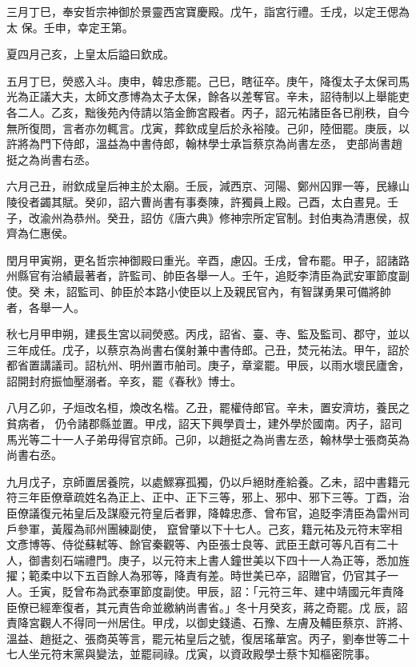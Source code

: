 \begin{pinyinscope}
 三月丁巳，奉安哲宗神御於景靈西宮寶慶殿。戊午，詣宮行禮。壬戌，以定王偲為太
 保。壬申，幸定王第。



 夏四月己亥，上皇太后謚曰欽成。



 五月丁巳，熒惑入斗。庚申，韓忠彥罷。己巳，瞎征卒。庚午，降復太子太保司馬光為正議大夫，太師文彥博為太子太保，餘各以差奪官。辛未，詔待制以上舉能吏各二人。乙亥，黜後苑內侍請以箔金飾宮殿者。丙子，詔元祐諸臣各已削秩，自今無所復問，言者亦勿輒言。戊寅，葬欽成皇后於永裕陵。己卯，陸佃罷。庚辰，以許將為門下侍郎，溫益為中書侍郎，翰林學士承旨蔡京為尚書左丞，
 吏部尚書趙挺之為尚書右丞。



 六月己丑，祔欽成皇后神主於太廟。壬辰，減西京、河陽、鄭州囚罪一等，民緣山陵役者蠲其賦。癸卯，詔六曹尚書有事奏陳，許獨員上殿。己酉，太白晝見。壬子，改渝州為恭州。癸丑，詔仿《唐六典》修神宗所定官制。封伯夷為清惠侯，叔齊為仁惠侯。



 閏月甲寅朔，更名哲宗神御殿曰重光。辛酉，慮囚。壬戌，曾布罷。甲子，詔諸路州縣官有治績最著者，許監司、帥臣各舉一人。壬午，追貶李清臣為武安軍節度副使。癸
 未，詔監司、帥臣於本路小使臣以上及親民官內，有智謀勇果可備將帥者，各舉一人。



 秋七月甲申朔，建長生宮以祠熒惑。丙戌，詔省、臺、寺、監及監司、郡守，並以三年成任。戊子，以蔡京為尚書右僕射兼中書侍郎。己丑，焚元祐法。甲午，詔於都省置講議司。詔杭州、明州置市舶司。庚子，章楶罷。甲辰，以雨水壞民廬舍，詔開封府振恤壓溺者。辛亥，罷《春秋》博士。



 八月乙卯，子烜改名桓，煥改名楷。乙丑，罷權侍郎官。辛未，置安濟坊，養民之貧病者，
 仍令諸郡縣並置。甲戌，詔天下興學貢士，建外學於國南。丙子，詔司馬光等二十一人子弟毋得官京師。己卯，以趙挺之為尚書左丞，翰林學士張商英為尚書右丞。



 九月戊子，京師置居養院，以處鰥寡孤獨，仍以戶絕財產給養。乙未，詔中書籍元符三年臣僚章疏姓名為正上、正中、正下三等，邪上、邪中、邪下三等。丁酉，治臣僚議復元祐皇后及謀廢元符皇后者罪，降韓忠彥、曾布官，追貶李清臣為雷州司戶參軍，黃履為祁州團練副使，
 竄曾肇以下十七人。己亥，籍元祐及元符末宰相文彥博等、侍從蘇軾等、餘官秦觀等、內臣張士良等、武臣王獻可等凡百有二十人，御書刻石端禮門。庚子，以元符末上書人鐘世美以下四十一人為正等，悉加旌擢；範柔中以下五百餘人為邪等，降責有差。時世美已卒，詔贈官，仍官其子一人。壬寅，貶曾布為武泰軍節度副使。甲辰，詔：「元符三年、建中靖國元年責降臣僚已經牽復者，其元責告命並繳納尚書省。」冬十月癸亥，蔣之奇罷。戊
 辰，詔責降宮觀人不得同一州居住。甲戌，以御史錢遹、石豫、左膚及輔臣蔡京、許將、溫益、趙挺之、張商英等言，罷元祐皇后之號，復居瑤華宮。丙子，劉奉世等二十七人坐元符末黨與變法，並罷祠祿。戊寅，以資政殿學士蔡卞知樞密院事。




\end{pinyinscope}
